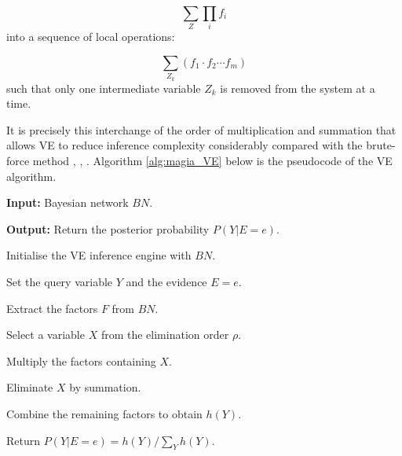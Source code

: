 $$\sum_Z \prod_i f_i$$
\noindent
into a sequence of local operations:

$$\sum_{Z_k} \left( f_1 \cdot f_2 \cdots f_m \right)$$
\noindent
such that only one intermediate variable $Z_k$ is removed from the system at a time.

It is precisely this interchange of the order of multiplication and summation that allows VE to reduce inference complexity considerably compared with the brute-force method \cite{darwiche2009modeling}, \cite{dechter1999bucket}, \cite{murphy2012machine}. Algorithm \ref{alg:magia_VE} below is the pseudocode of the VE algorithm.

\vspace{1em}
\begin{algorithm}
    \caption{Pseudocode of the variable elimination inference algorithm}
\vspace{0.5em}
\label{alg:magia_VE}

\textbf{Input:} Bayesian network $BN$.

\vspace{0.2cm}

\textbf{Output:} Return the posterior probability $P(Y|E=e)$.

\vspace{0.2cm}
\begin{tcolorbox}
\begin{algorithmic}[1]
\State Initialise the VE inference engine with $BN$.

\vspace{0.1cm}
\State Set the query variable $Y$ and the evidence $E=e$.

\vspace{0.1cm}
\State Extract the factors $F$ from $BN$.

\vspace{0.1cm}

\vspace{0.1cm}
    \State Select a variable $X$ from the elimination order $\rho$.

\vspace{0.1cm}
    \State Multiply the factors containing $X$.

\vspace{0.1cm}
    \State Eliminate $X$ by summation.

\vspace{0.1cm}
\EndWhile

\vspace{0.1cm}
\State Combine the remaining factors to obtain $h(Y)$.

\vspace{0.1cm}
\State Return $P(Y|E=e) = h(Y) \text{/} \sum_Y h(Y)$.

\end{algorithmic}
\end{tcolorbox}
\end{algorithm}

